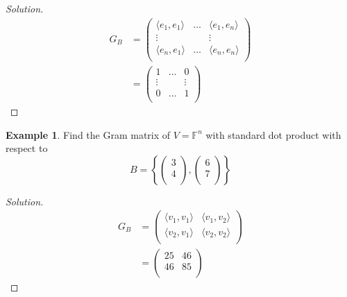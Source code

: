 \documentclass[fleqn, a4paper, 12pt]{article}
\theoremstyle{definition}
\newtheorem{example}{Example} %
\theoremstyle{theorem}
\theoremstyle{remark}
\newenvironment{solution} %
	{\begin{proof}[Solution]\let\qed\relax}
	{\end{proof}}
\numberwithin{corollary}{theorem}
\numberwithin{equation}{theorem}
\begin{document}
\begin{solution}
	\begin{align*}
		G_B &= 
			\begin{pmatrix}
				\langle e_1, e_1 \rangle & \dots & \langle e_1, e_n \rangle\\
				\vdots & & \vdots\\
				\langle e_n, e_1 \rangle & \dots & \langle e_n, e_n \rangle\\
			\end{pmatrix}\\
		&= 
			\begin{pmatrix}
				1 & \dots & 0\\
				\vdots & & \vdots\\
				0 & \dots & 1\\
			\end{pmatrix}
	\end{align*}
\end{solution}

\begin{example}
	Find the Gram matrix of $V = \mathbb{F}^n$ with standard dot product with respect to 
	\begin{equation*}
		B = 
			\left\lbrace
				\begin{pmatrix}
					3\\
					4\\
				\end{pmatrix}
				,
				\begin{pmatrix}
					6\\
					7\\
				\end{pmatrix}
			\right\rbrace
	\end{equation*}
\end{example}

\begin{solution}
	\begin{align*}
		G_B &= 
			\begin{pmatrix}
				\langle v_1, v_1 \rangle & \langle v_1, v_2 \rangle\\
				\langle v_2, v_1 \rangle & \langle v_2, v_2 \rangle\\
			\end{pmatrix}\\
		&= 
			\begin{pmatrix}
				25 & 46\\
				46 & 85\\
			\end{pmatrix}
	\end{align*}
\end{solution}
\end{document}
